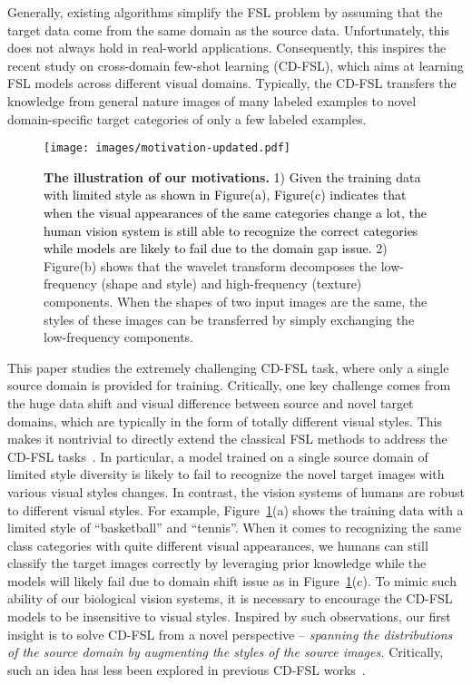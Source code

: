 \documentclass{article}
\newcommand{\fyq}{\textcolor{black}}
\begin{document}
Generally, existing algorithms simplify the FSL problem by assuming that the target data come from the same domain as the source data. Unfortunately, this does not always hold in real-world applications. Consequently, this inspires the recent study on cross-domain few-shot learning (CD-FSL), which aims at learning FSL models across different visual domains. Typically, the CD-FSL transfers the knowledge from general nature images of many labeled examples to novel domain-specific target categories of only a few labeled examples.




\begin{figure}[t]
	\centering
	\texttt{[image: images/motivation-updated.pdf]}
\caption{\textbf{The illustration of our motivations.} 
	\fyq{1) Given the training data with limited style as shown in Figure(a), Figure(c) indicates that when the visual appearances of the same categories change a lot, the human vision system is still able to recognize the correct categories while models are likely to fail due to the domain gap issue.}
	2) Figure(b) shows that the wavelet transform decomposes the low-frequency (shape and style) and high-frequency (texture) components. When the shapes of two input images are the same, the styles of these images can be transferred by simply exchanging the low-frequency components.}
	\label{fig:motivation} 
	\vspace{-0.25in}
\end{figure}


This paper studies the extremely challenging CD-FSL task, where only a single source domain is provided for training. Critically, one key challenge comes from the huge data shift and visual difference between source and novel target domains, which are typically in the form of totally different visual styles. This makes it nontrivial to directly extend the classical FSL methods to address the CD-FSL tasks~\cite{chen2019closer}. 
In particular, a model trained on a single source domain of limited style diversity is likely to fail to recognize the novel target images with various visual styles changes. In contrast, the vision systems of humans are robust to different visual styles. 
For example, Figure~\ref{fig:motivation}(a) shows the training data with a limited style of ``basketball'' and ``tennis''. When it comes to recognizing the same class categories with quite different visual appearances, we humans can still classify the target images correctly by leveraging prior knowledge while the models will likely fail due to domain shift issue as in Figure~\ref{fig:motivation}(c).
To mimic such ability of our biological vision systems, it is necessary to encourage the CD-FSL models to be insensitive to visual styles. 
Inspired by such observations, our first insight
is to solve CD-FSL from a novel perspective -- \emph{spanning the distributions of the source domain by augmenting the styles of the source images.}
Critically, such an idea has less been explored in previous CD-FSL works~\cite{tseng2020cross,guo2020broader,phoo2020self,fu2021meta,sun2021explanation,guan2020large,liang2021boosting,islam2021dynamic,zhang2021shallow}.
\end{document}
